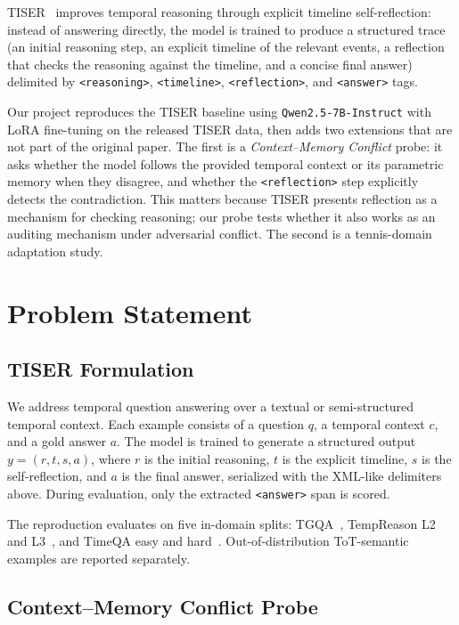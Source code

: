 \documentclass[conference]{IEEEtran}
\begin{document}
TISER~\cite{bazaga2025tiser} improves temporal reasoning through explicit timeline self-reflection: instead of answering directly, the model is trained to produce a structured trace (an initial reasoning step, an explicit timeline of the relevant events, a reflection that checks the reasoning against the timeline, and a concise final answer) delimited by \texttt{<reasoning>}, \texttt{<timeline>}, \texttt{<reflection>}, and \texttt{<answer>} tags.

Our project reproduces the TISER baseline using \texttt{Qwen2.5-7B-Instruct} with LoRA fine-tuning on the released TISER data, then adds two extensions that are not part of the original paper. The first is a \emph{Context--Memory Conflict} probe: it asks whether the model follows the provided temporal context or its parametric memory when they disagree, and whether the \texttt{<reflection>} step explicitly detects the contradiction. This matters because TISER presents reflection as a mechanism for checking reasoning; our probe tests whether it also works as an auditing mechanism under adversarial conflict. The second is a tennis-domain adaptation study.

\section{Problem Statement}

\subsection{TISER Formulation}

We address temporal question answering over a textual or semi-structured temporal context. Each example consists of a question $q$, a temporal context $c$, and a gold answer $a$. The model is trained to generate a structured output $y = (r, t, s, a)$, where $r$ is the initial reasoning, $t$ is the explicit timeline, $s$ is the self-reflection, and $a$ is the final answer, serialized with the XML-like delimiters above. During evaluation, only the extracted \texttt{<answer>} span is scored.

The reproduction evaluates on five in-domain splits: TGQA~\cite{xiong2024tgqa}, TempReason L2 and L3~\cite{tan2023tempreason}, and TimeQA easy and hard~\cite{chen2021timeqa}. Out-of-distribution ToT-semantic examples are reported separately.

\subsection{Context--Memory Conflict Probe}
\end{document}
